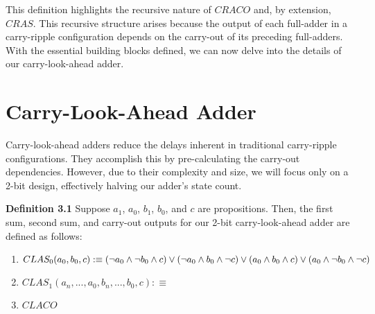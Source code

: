 \documentclass{article}
\begin{document}
This definition highlights the recursive nature of \( CRACO \) and, by extension, \( CRAS \). This recursive structure arises because the output of each full-adder in a carry-ripple configuration depends on the carry-out of its preceding full-adders. With the essential building blocks defined, we can now delve into the details of our carry-look-ahead adder.

\section{Carry-Look-Ahead Adder}
Carry-look-ahead adders reduce the delays inherent in traditional carry-ripple configurations. They accomplish this by pre-calculating the carry-out dependencies. However, due to their complexity and size, we will focus only on  a 2-bit design, effectively halving our adder's state count.

\noindent \textbf{Definition 3.1} Suppose $a_1$, $a_0$, $b_1$, $b_0$, and $c$ are propositions. Then, the first sum, second sum, and carry-out outputs for our 2-bit carry-look-ahead adder are defined as follows: 
\begin{enumerate}
	\item $ CLAS_0(a_0, b_0, c) :\equiv (\lnot a_0 \land \lnot b_0 \land c) \lor (\lnot a_0 \land b_0 \land \lnot c) \lor \\ (a_0 \land b_0 \land c) \lor (a_0 \land \lnot b_0 \land \lnot c)$
	\item $ CLAS_1(a_n, ..., a_0, b_n, ..., b_0, c) :\equiv $
	\item $ CLACO $
\end{enumerate}
\end{document}
